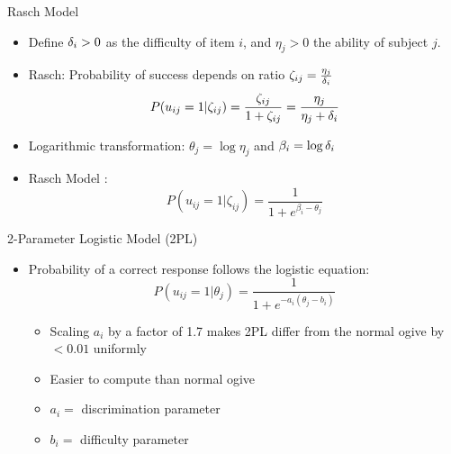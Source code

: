 \documentclass{beamer}
\def \d{\ensuremath \delta}
\theoremstyle{definition}
\begin{document}
\begin{frame}{Rasch Model}
\begin{itemize}
  \item Define $\d_i > 0$ as the difficulty of item $i$, and $\eta_j > 0$ the ability of subject $j$.
  \item Rasch: Probability of success depends on ratio $\zeta_{ij} = \frac{\eta_j}{\d_i}$
  \[P(u_{ij} = 1 | \zeta_{ij}) = \frac{\zeta_{ij}}{1 + \zeta_{ij}} = \frac{\eta_j}{\eta_j + \d_i}\]
  \item Logarithmic transformation: $\theta_j = \log \eta_j$ and $\beta_i = \log \d_i$
  \item Rasch Model :
  \[P(u_{ij} = 1 | \zeta_{ij}) = \frac{1}{1 + e^{\beta_i - \theta_j}}\]
\end{itemize}
\end{frame}

\begin{frame}{2-Parameter Logistic Model (2PL)}
\begin{itemize}
  \item Probability of a correct response follows the logistic equation:
  \[P(u_{ij} = 1 | \theta_j) = \frac{1}{1 + e^{-a_i(\theta_j - b_i)}}\]
  \begin{itemize}
    \item<2-> Scaling $a_i$ by a factor of 1.7 makes 2PL differ from the normal ogive by $<0.01$ uniformly
    \item<2-> Easier to compute than normal ogive
    \item<2-> $a_i =$ discrimination parameter
    \item<2-> $b_i =$ difficulty parameter
  \end{itemize}
\end{itemize}
\end{frame}
\end{document}
